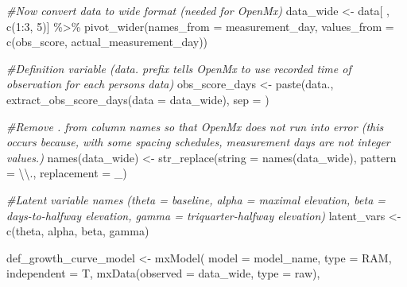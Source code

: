 \documentclass[
12pt, %
twoside,
english]{guelphthesis}
\newenvironment{Shaded}{\begin{snugshade}}{\end{snugshade}}
\newcommand{\AttributeTok}[1]{\textcolor[rgb]{0.77,0.63,0.00}{#1}}
\newcommand{\CommentTok}[1]{\textcolor[rgb]{0.56,0.35,0.01}{\textit{#1}}}
\newcommand{\DecValTok}[1]{\textcolor[rgb]{0.00,0.00,0.81}{#1}}
\newcommand{\FunctionTok}[1]{\textcolor[rgb]{0.00,0.00,0.00}{#1}}
\newcommand{\NormalTok}[1]{#1}
\newcommand{\OtherTok}[1]{\textcolor[rgb]{0.56,0.35,0.01}{#1}}
\newcommand{\SpecialCharTok}[1]{\textcolor[rgb]{0.00,0.00,0.00}{#1}}
\newcommand{\StringTok}[1]{\textcolor[rgb]{0.31,0.60,0.02}{#1}}
\begin{document}
\restoreparindent\label{definition-model}
\begin{Shaded}
\begin{Highlighting}[numbers=left,,]
\CommentTok{\#Now convert data to wide format (needed for OpenMx)}
\NormalTok{data\_wide }\OtherTok{\textless{}{-}}\NormalTok{ data[ , }\FunctionTok{c}\NormalTok{(}\DecValTok{1}\SpecialCharTok{:}\DecValTok{3}\NormalTok{, }\DecValTok{5}\NormalTok{)] }\SpecialCharTok{\%\textgreater{}\%} 
    \FunctionTok{pivot\_wider}\NormalTok{(}\AttributeTok{names\_from =}\NormalTok{ measurement\_day, }\AttributeTok{values\_from =} \FunctionTok{c}\NormalTok{(obs\_score, actual\_measurement\_day))}

\CommentTok{\#Definition variable (data. prefix tells OpenMx to use recorded time of observation for each person\textquotesingle{}s data)}
\NormalTok{obs\_score\_days }\OtherTok{\textless{}{-}} \FunctionTok{paste}\NormalTok{(}\StringTok{\textquotesingle{}data.\textquotesingle{}}\NormalTok{, }\FunctionTok{extract\_obs\_score\_days}\NormalTok{(}\AttributeTok{data =}\NormalTok{ data\_wide), }\AttributeTok{sep =} \StringTok{\textquotesingle{}\textquotesingle{}}\NormalTok{) }

\CommentTok{\#Remove . from column names so that OpenMx does not run into error (this occurs because, with some spacing schedules, measurement days are not integer values.) }
\FunctionTok{names}\NormalTok{(data\_wide) }\OtherTok{\textless{}{-}} \FunctionTok{str\_replace}\NormalTok{(}\AttributeTok{string =} \FunctionTok{names}\NormalTok{(data\_wide), }\AttributeTok{pattern =} \StringTok{\textquotesingle{}}\SpecialCharTok{\textbackslash{}\textbackslash{}}\StringTok{.\textquotesingle{}}\NormalTok{, }\AttributeTok{replacement =} \StringTok{\textquotesingle{}\_\textquotesingle{}}\NormalTok{)}

\CommentTok{\#Latent variable names (theta = baseline, alpha = maximal elevation, beta = days{-}to{-}halfway elevation, gamma = triquarter{-}halfway elevation)}
\NormalTok{latent\_vars }\OtherTok{\textless{}{-}} \FunctionTok{c}\NormalTok{(}\StringTok{\textquotesingle{}theta\textquotesingle{}}\NormalTok{, }\StringTok{\textquotesingle{}alpha\textquotesingle{}}\NormalTok{, }\StringTok{\textquotesingle{}beta\textquotesingle{}}\NormalTok{, }\StringTok{\textquotesingle{}gamma\textquotesingle{}}\NormalTok{) }

\NormalTok{def\_growth\_curve\_model }\OtherTok{\textless{}{-}} \FunctionTok{mxModel}\NormalTok{(}
  \AttributeTok{model =}\NormalTok{ model\_name,}
  \AttributeTok{type =} \StringTok{\textquotesingle{}RAM\textquotesingle{}}\NormalTok{, }\AttributeTok{independent =}\NormalTok{ T,}
  \FunctionTok{mxData}\NormalTok{(}\AttributeTok{observed =}\NormalTok{ data\_wide, }\AttributeTok{type =} \StringTok{\textquotesingle{}raw\textquotesingle{}}\NormalTok{),}
  

\end{Highlighting}
\end{Shaded}
\end{document}
